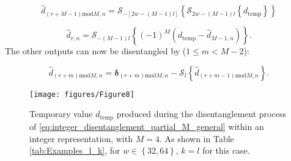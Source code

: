 \documentclass[twocolumn,english,onecolumn]{IEEEtran}
\theoremstyle{plain}
\theoremstyle{plain}
\begin{document}
\begin{equation}
\hat{d}_{\left(r+M-1\right)\text{mod}M,n}=\mathcal{S}_{-\left[2w-\left(M-1\right)l\right]}\left\{ \mathcal{S}_{2w-\left(M-1\right)l}\left\{ d_{\textrm{temp}}\right\} \right\} \label{eq:integer_signed_disentanglement_partial_M_general}
\end{equation}


\begin{equation}
\hat{d}_{r,n}=\mathcal{S}_{-\left(M-1\right)l}\left\{ \left(-1\right)^{M}\left(d_{\textrm{temp}}-\hat{d}_{M-1,n}\right)\right\} .\label{eq:d_hat_0,n}
\end{equation}
The other outputs can now be disentangled by ($1\leq m<M-2$): 

\begin{equation}
\hat{d}_{\left(r+m\right)\text{mod}M,n}=\mathrm{\mathbf{\delta}}_{\left(r+m\right)\text{mod}M,n}-\mathcal{S}_{l}\left\{ \hat{d}_{\left(r+m-1\right)\text{mod}M,n}\right\} .\label{eq:integer_disentanglement_M_general-1}
\end{equation}


\begin{figure}[tbh]
\begin{centering}
\texttt{[image: figures/Figure8]}
\par\end{centering}

\protect\caption{Temporary value $d_{\textrm{temp}}$ produced during the disentanglement
process of \eqref{eq:integer_disentanglement_partial_M_general} within
an integer representation, with $M=4$. As shown in Table \ref{tab:Examples_l_k},
for $w\in\left\{ 32,64\right\} $, $k=l$ for this case. \label{fig:Entanglement-with-M_equal_4_2} }
\end{figure}
\end{document}
